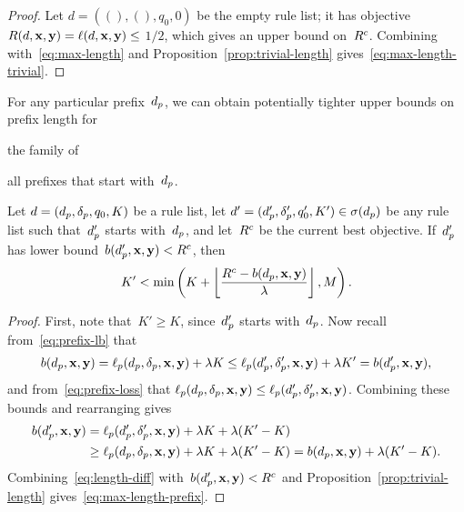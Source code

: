 \begin{arxiv}
\begin{proof}
Let ${d = ((), (), q_0, 0)}$ be the empty rule list;
it has objective ${R({d}, \mathbf{x}, \mathbf{y}) = \ell({d}, \mathbf{x}, \mathbf{y}) \le}$ ${1/2}$,
which gives an upper bound on~${R^c}$.
%
Combining with~\eqref{eq:max-length}
and Proposition~\ref{prop:trivial-length}
gives~\eqref{eq:max-length-trivial}.
\end{proof}
\end{arxiv}

For any particular prefix~$d_p$, we can obtain potentially tighter
upper bounds on prefix length for
\begin{arxiv}
the family of
\end{arxiv}
all prefixes that start with~$d_p$.


\begin{theorem}
\label{thm:ub-prefix-specific}
Let ${{d} = (d_p, \delta_p, q_0, K)}$ be a rule list, let
${{d}' = (d_p', \delta_p', q_0', K') \in \sigma(d_p)}$
be any rule list such that~$d_p'$ starts with~$d_p$,
and let~${R^c}$ be the current best objective.
%
If~$d_p'$ has lower bound~${b(d_p', \mathbf{x}, \mathbf{y}) < {R^c}}$, then
\begin{align}
K' < \min \left( K + \left\lfloor \frac{{R^c} - b(d_p, \mathbf{x}, \mathbf{y})}{{\lambda}} \right\rfloor, M \right).
\label{eq:max-length-prefix}
\end{align}
\end{theorem}

\begin{arxiv}
\begin{proof}
First, note that~${K' \ge K}$, since~$d_p'$ starts with~$d_p$.
%
Now recall from~\eqref{eq:prefix-lb} that
%
\begin{align}
b(d_p, \mathbf{x}, \mathbf{y}) = \ell_p(d_p, \delta_p, \mathbf{x}, \mathbf{y}) + {\lambda} K
\le \ell_p(d_p', \delta_p', \mathbf{x}, \mathbf{y}) + {\lambda} K' = b(d_p', \mathbf{x}, \mathbf{y}),
\end{align}
%
and from~\eqref{eq:prefix-loss} that
${\ell_p(d_p, \delta_p, \mathbf{x}, \mathbf{y}) \le \ell_p(d_p', \delta_p', \mathbf{x}, \mathbf{y})}$.
%
Combining these bounds and rearranging gives
\begin{align}
b(d_p', \mathbf{x}, \mathbf{y}) &= \ell_p(d_p', \delta_p', \mathbf{x}, \mathbf{y}) + {\lambda} K + {\lambda}(K' - K) \nonumber \\
&\ge \ell_p(d_p, \delta_p, \mathbf{x}, \mathbf{y}) + {\lambda} K + {\lambda}(K' - K)
= b(d_p, \mathbf{x}, \mathbf{y}) + {\lambda} (K' - K).
\label{eq:length-diff}
\end{align}
Combining~\eqref{eq:length-diff} with~${b(d_p', \mathbf{x}, \mathbf{y}) < {R^c}}$
and Proposition~\ref{prop:trivial-length} gives~\eqref{eq:max-length-prefix}.
\end{proof}
\end{arxiv}

